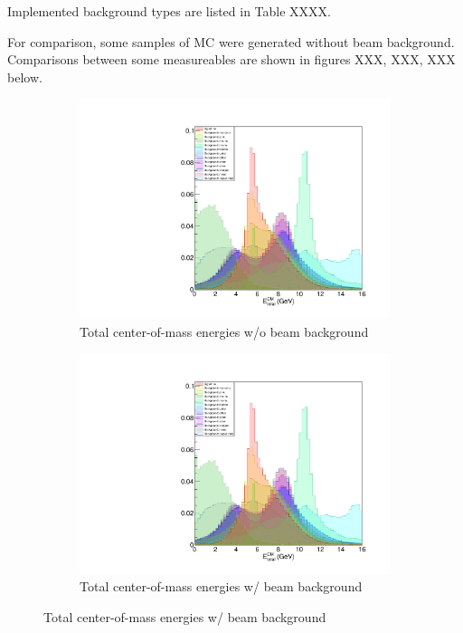 \documentclass[12pt]{thesis}  %
\begin{document}
Implemented background types are listed in Table XXXX.




For comparison, some samples of MC were generated without beam background. Comparisons between some measureables are shown in figures XXX, XXX, XXX below.

   \begin{figure}[h]
        \centering
        \begin{subfigure}[b]{0.475\textwidth}
            \centering
            \includegraphics[width=\textwidth]{images/test.pdf}
            \caption[Network2]%
            {{\small Total center-of-mass energies w/o beam background}}    
            \label{fig:mean and std of net14}
        \end{subfigure}
        \hfill
        \begin{subfigure}[b]{0.475\textwidth}  
            \centering 
            \includegraphics[width=\textwidth]{images/test.pdf}
            \caption[]%
            {{\small Total center-of-mass energies w/ beam background}}    
            \label{fig:mean and std of net24}
        \end{subfigure}
    \end{figure}
    
\end{document}
